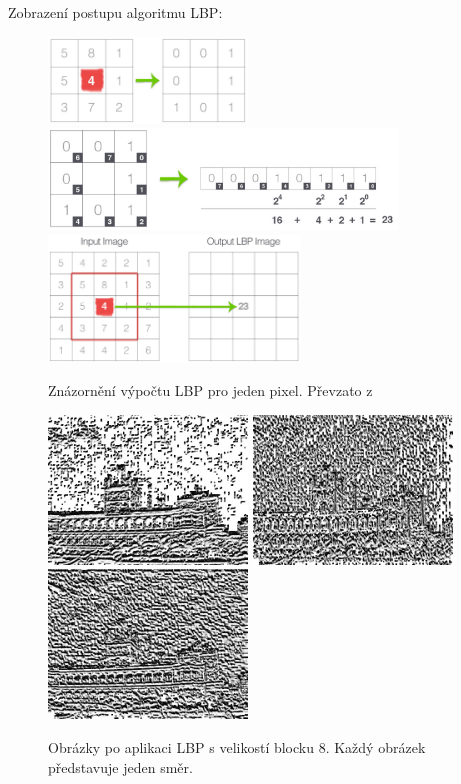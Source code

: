\documentclass{report}
\begin{document}
Zobrazení postupu algoritmu LBP: 
\begin{figure}[H]
		\centering
		\includegraphics[width=200px]{./img/lbp_thresholding.jpg}
		\\[0.5cm]	
		\includegraphics[width=350px]{./img/lbp_calculation.jpg}
		\\[0.5cm]
		\includegraphics[width=253px]{./img/lbp_to_output.jpg}	
		\caption{Znázornění výpočtu LBP pro jeden pixel. Převzato z \cite{Pyimagesearch}}
\end{figure} 
 
\begin{figure}[H]
	\centering
	\includegraphics[width=150pt]{./img/lbp1.jpg}
	\includegraphics[width=150pt]{./img/lbp2.jpg}
	\includegraphics[width=150pt]{./img/lbp3.jpg}
	\caption{Obrázky po aplikaci LBP s velikostí blocku 8. Každý obrázek představuje jeden směr.}
\end{figure}
\end{document}
